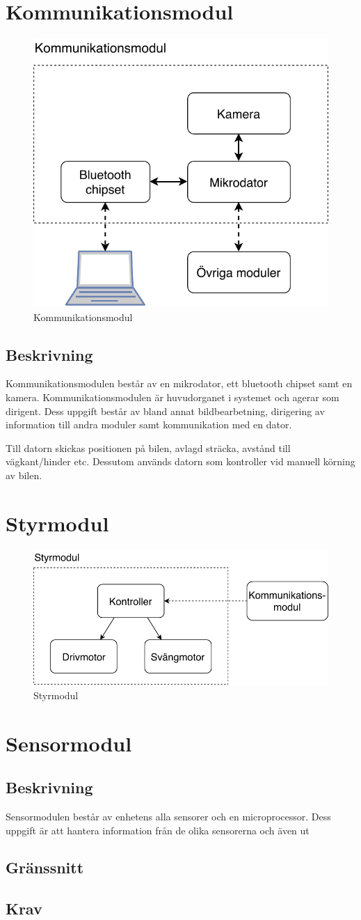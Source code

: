 \documentclass[kravspec/krav.tex]{subfiles}
\begin{document}
\section{Kommunikationsmodul}
\begin{figure}[h]
    \centering
    \includegraphics[width=0.6\linewidth]{kravspec/figures/kommunikationsmodul.pdf}
    \caption{Kommunikationsmodul}
    \label{fig:kommunikationsmodul}
\end{figure}
\subsection{Beskrivning}
Kommunikationsmodulen består av en mikrodator, ett bluetooth chipset samt en
kamera. Kommunikationsmodulen är huvudorganet i systemet och agerar som
dirigent. Dess uppgift består av bland annat bildbearbetning, dirigering av
information till andra moduler samt kommunikation med en dator.

Till datorn skickas positionen på bilen, avlagd sträcka, avstånd till
vägkant/hinder etc. Dessutom används datorn som kontroller vid manuell körning
av bilen.

\section{Styrmodul}
\begin{figure}[h]
    \centering
    \includegraphics[width=0.6\linewidth]{kravspec/figures/styrmodul.pdf}
    \caption{Styrmodul}
    \label{fig:styrmodul}
\end{figure}

\section{Sensormodul}
\subsection{Beskrivning}
Sensormodulen består av enhetens alla sensorer och en microprocessor. Dess
uppgift är att hantera information från de olika sensorerna och även
ut
\subsection{Gränssnitt}
\subsection{Krav}
\end{document}

